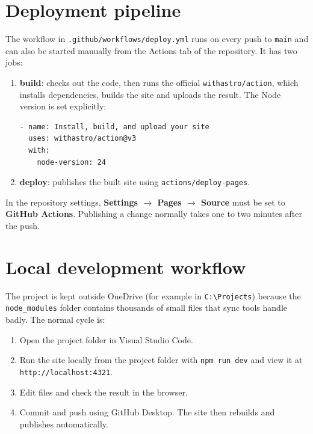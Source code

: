 \documentclass[11pt,a4paper]{article}
\begin{document}
\section{Deployment pipeline}
The workflow in \texttt{.github/workflows/deploy.yml} runs on every push to
\texttt{main} and can also be started manually from the Actions tab of the
repository. It has two jobs:
\begin{enumerate}[nosep]
  \item \textbf{build}: checks out the code, then runs the official
        \texttt{withastro/action}, which installs dependencies, builds the site
        and uploads the result. The Node version is set explicitly:
\begin{lstlisting}
- name: Install, build, and upload your site
  uses: withastro/action@v3
  with:
    node-version: 24
\end{lstlisting}
  \item \textbf{deploy}: publishes the built site using
        \texttt{actions/deploy-pages}.
\end{enumerate}
In the repository settings, \textbf{Settings $\rightarrow$ Pages $\rightarrow$
Source} must be set to \textbf{GitHub Actions}. Publishing a change normally
takes one to two minutes after the push.

\section{Local development workflow}
The project is kept outside OneDrive (for example in
\texttt{C:\textbackslash Projects}) because the \texttt{node\_}\texttt{modules}
folder contains thousands of small files that sync tools handle badly. The
normal cycle is:
\begin{enumerate}[nosep]
  \item Open the project folder in Visual Studio Code.
  \item Run the site locally from the project folder with
        \texttt{npm run dev} and view it at \texttt{http://localhost:4321}.
  \item Edit files and check the result in the browser.
  \item Commit and push using GitHub Desktop. The site then rebuilds and
        publishes automatically.
\end{enumerate}
\end{document}
